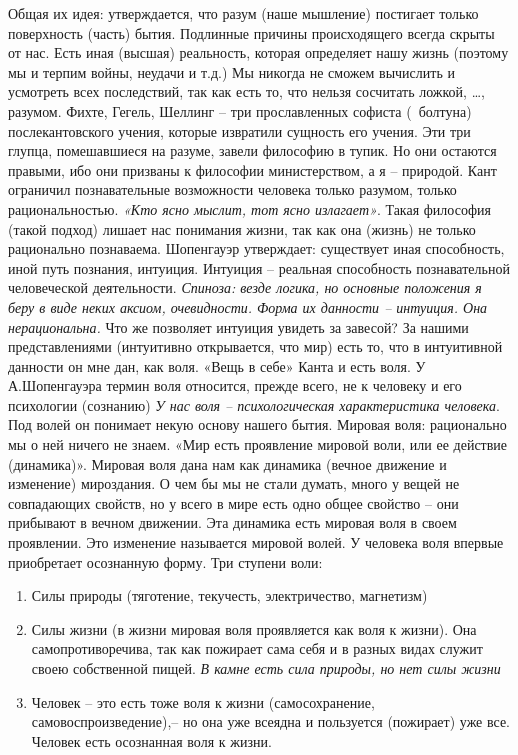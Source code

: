 \documentclass[12pt]{article}
\begin{document}
Общая  их  идея:  утверждается,  что  разум  (наше  мышление)  постигает  только  поверхность  (часть)  бытия.
Подлинные причины происходящего всегда скрыты от нас. Есть иная (высшая) реальность, которая определяет
нашу жизнь (поэтому мы и терпим войны, неудачи и т.д.) Мы никогда не сможем вычислить и усмотреть всех
последствий, так как есть то, что нельзя сосчитать ложкой, …, разумом.
Фихте, Гегель, Шеллинг – три прославленных софиста (~болтуна) послекантовского учения, которые извратили
сущность его учения. Эти три глупца, помешавшиеся на разуме, завели философию в тупик. Но они остаются
правыми, ибо они призваны к философии министерством, а я – природой.
Кант ограничил познавательные возможности человека только разумом, только рациональностью.
\textit{ «Кто ясно
мыслит, тот ясно излагает»}. Такая философия (такой подход) лишает нас понимания жизни, так как она
(жизнь) не только рационально познаваема.
Шопенгауэр утверждает: существует иная способность, иной путь познания, интуиция.
Интуиция – реальная способность познавательной человеческой деятельности. \textit{ Спиноза: везде логика, но
основные  положения  я  беру  в  виде  неких  аксиом,  очевидности.  Форма  их  данности  –  интуиция.  Она
нерациональна.}
Что же позволяет интуиция увидеть за завесой? За нашими представлениями (интуитивно открывается, что
мир) есть то, что в интуитивной данности он мне дан, как воля. «Вещь в себе» Канта и есть воля.
У А.Шопенгауэра термин воля относится, прежде всего, не к человеку и его психологии (сознанию)
\textit{У нас
  воля – психологическая характеристика человека}. Под волей он понимает некую основу нашего бытия.
Мировая воля: рационально мы о ней ничего не знаем. 
«Мир есть проявление мировой воли, или ее действие (динамика)». Мировая воля дана нам как динамика
(вечное движение и изменение) мироздания. О чем бы мы не стали думать, много у вещей не совпадающих
свойств, но у всего в мире есть одно общее свойство – они прибывают в вечном движении. Эта динамика есть
мировая воля в своем проявлении. Это изменение называется мировой волей.
У человека воля впервые приобретает осознанную форму.
Три ступени воли:
\begin{enumerate}
\item Силы природы (тяготение, текучесть, электричество, магнетизм)
\item Силы жизни (в жизни мировая воля проявляется как воля к жизни). Она самопротиворечива, так как пожирает
  сама себя и в разных видах служит своею собственной пищей. \textit{В камне есть сила природы, но нет силы жизни}
\item Человек – это есть  тоже воля к жизни (самосохранение, самовоспроизведение),– но она уже всеядна и
пользуется (пожирает) уже все. Человек есть осознанная воля к жизни.
\end{enumerate}
\end{document}
